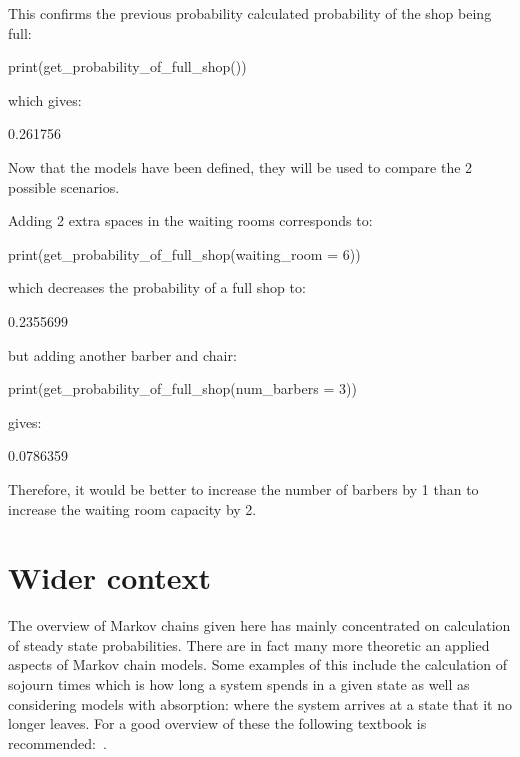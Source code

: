 This confirms the previous probability calculated probability of the shop
being full:

\begin{Rin}
print(get_probability_of_full_shop())
\end{Rin}

which gives:

\begin{Rout}
[1] 0.261756
\end{Rout}

Now that the models have been defined, they will be used to compare the 2
possible scenarios.

Adding 2 extra spaces in the waiting rooms corresponds to:

\begin{Rin}
print(get_probability_of_full_shop(waiting_room = 6))
\end{Rin}

which decreases the probability of a full shop to:

\begin{Rout}
[1] 0.2355699
\end{Rout}

but adding another barber and chair:

\begin{Rin}
print(get_probability_of_full_shop(num_barbers = 3))
\end{Rin}

gives:

\begin{Rout}
[1] 0.0786359
\end{Rout}

Therefore, it would be better to increase the number of barbers by 1
than to increase the waiting room capacity by 2.


\section{Wider context}\label{sec:markov_chains_wider_context}

The overview of Markov chains given here has mainly concentrated on calculation
of steady state probabilities. There are in fact many more theoretic an applied
aspects of Markov chain models. Some examples of this include the calculation of
sojourn times which is how long a system spends in a given state as well as
considering models with absorption: where the system arrives at a state that it
no longer leaves. For a good overview of
these the following textbook is recommended:~\cite{stewart2009probability}.

